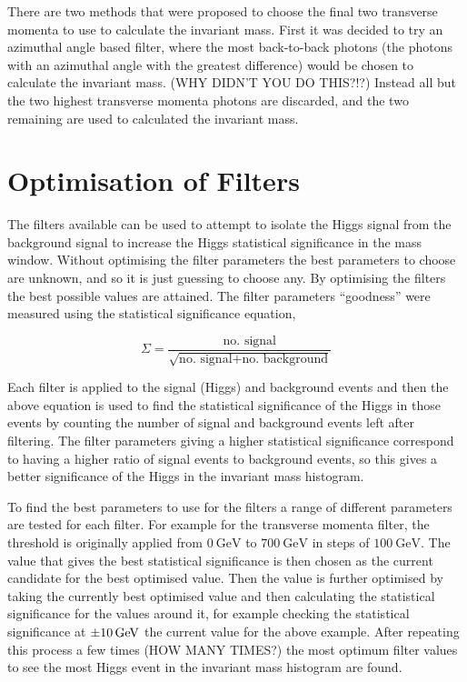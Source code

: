 \documentclass[11pt]{amsart}
\begin{document}
\begin{multicols}{2}
There are two methods that were proposed to choose the final two transverse momenta to use to calculate the invariant mass. First it was decided to try an azimuthal angle based filter, where the most back-to-back photons (the photons with an azimuthal angle with the greatest difference) would be chosen to calculate the invariant mass. (WHY DIDN'T YOU DO THIS?!?) Instead all but the two highest transverse momenta photons are discarded, and the two remaining are used to calculated the invariant mass.


\section{Optimisation of Filters}
\label{sec:optimisation}

The filters available can be used to attempt to isolate the Higgs signal from the background signal to increase the Higgs statistical significance in the mass window. Without optimising the filter parameters the best parameters to choose are unknown, and so it is just guessing to choose any. By optimising the filters the best possible values are attained. The filter parameters ``goodness'' were measured using the statistical significance equation,

\begin{equation}
  \label{eq:significance}
  \Sigma = \frac{\text{no. signal}}{\sqrt{\text{no. signal} + \text{no. background}}}
\end{equation}

Each filter is applied to the signal (Higgs) and background events and then the above equation is used to find the statistical significance of the Higgs in those events by counting the number of signal and background events left after filtering. The filter parameters giving a higher statistical significance correspond to having a higher ratio of signal events to background events, so this gives a better significance of the Higgs in the invariant mass histogram.

To find the best parameters to use for the filters a range of different parameters are tested for each filter. For example for the transverse momenta filter, the threshold is originally applied from $\SI{0}{\giga\electronvolt}$ to $\SI{700}{\giga\electronvolt}$ in steps of $\SI{100}{\giga\electronvolt}$. The value that gives the best statistical significance is then chosen as the current candidate for the best optimised value. Then the value is further optimised by taking the currently best optimised value and then calculating the statistical significance for the values around it, for example checking the statistical significance at $\SI{\pm10}{\giga\electronvolt}$ the current value for the above example. After repeating this process a few times (HOW MANY TIMES?) the most optimum filter values to see the most Higgs event in the invariant mass histogram are found.


\end{multicols}
\end{document}
